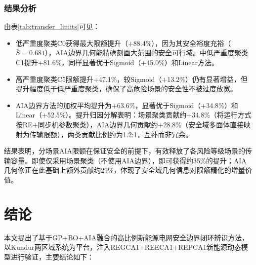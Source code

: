 \documentclass[a4paper,11pt]{ctexart}
\begin{document}
\subsubsection{结果分析}

由表\ref{tab:transfer_limits}可见：
\begin{itemize}
    \item 低严重度聚类C0获得最大限额提升（+88.4\%），因为其安全裕度充裕（$\bar{S}=0.681$），AIA边界几何能精确刻画大范围的安全可行域。中低严重度聚类C1提升+81.6\%，同样显著优于Sigmoid（+45.0\%）和Linear方法。
    \item 高严重度聚类C5限额提升+47.1\%，较Sigmoid（+13.2\%）仍有显著增益，但提升幅度低于低严重度聚类，确保了高危险场景的安全性不被过度放宽。
    \item AIA边界方法的加权平均提升为+63.6\%，显著优于Sigmoid（+34.8\%）和Linear（+52.5\%）。提升归因分解表明：场景聚类贡献约+34.8\%（将运行方式按RE+同步机参数聚类），AIA边界几何贡献约+28.8\%（安全域多面体直接映射为传输限额），两类贡献比例约为1.2:1，互补而非冗余。
\end{itemize}

结果表明，分场景AIA限额在保证安全的前提下，有效释放了各风险等级场景的传输容量。即使仅采用场景聚类（不使用AIA边界），即可获得约35\%的提升；AIA几何修正在此基础上额外贡献约29\%，体现了安全域几何信息对限额精化的增量价值。

\section{结论}
\label{sec:conclusion}

本文提出了基于GP+BO+AIA融合的高比例新能源电网安全边界闭环辨识方法，以Kundur两区域系统为平台，注入REGCA1+REECA1+REPCA1新能源动态模型进行验证，主要结论如下：
\end{document}
